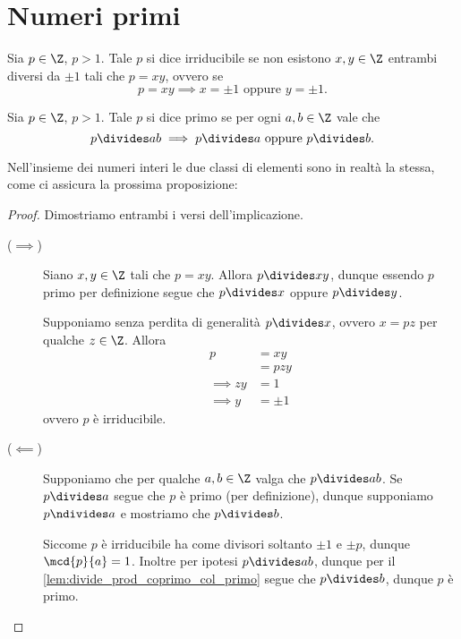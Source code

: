 \section{Numeri primi}

\begin{definition}
    [Irreducibile]
    Sia $p \in \Z$, $p > 1$. Tale $p$ si dice irriducibile se non esistono $x, y \in \Z$ entrambi diversi da $\pm 1$ tali che $p = xy$, ovvero se \begin{equation}
        p = xy \implies x = \pm 1 \text{ oppure } y = \pm 1.
    \end{equation}
\end{definition}

\begin{definition}
    [Primo]
    Sia $p \in \Z$, $p > 1$. Tale $p$ si dice primo se per ogni $a, b \in \Z$ vale che \begin{equation}
        p \divides ab \implies p \divides a \text{ oppure } p \divides b.
    \end{equation}
\end{definition}

Nell'insieme dei numeri interi le due classi di elementi sono in realtà la stessa, come ci assicura la prossima proposizione:
\begin{proof}
    Dimostriamo entrambi i versi dell'implicazione.
    \begin{description}
        \item[($\implies$)] Siano $x, y \in \Z$ tali che $p = xy$. Allora $p \divides xy$, dunque essendo $p$ primo per definizione segue che $p \divides x$ oppure $p \divides y$.
        
        Supponiamo senza perdita di generalità $p \divides x$, ovvero $x = pz$ per qualche $z \in \Z$. Allora \begin{align*}
            p &= xy \\
            &= pzy \\
            \implies zy &= 1 \\
            \implies y &= \pm 1
        \end{align*} ovvero $p$ è irriducibile.
        \item[($\impliedby$)] Supponiamo che per qualche $a, b \in \Z$ valga che $p \divides ab$. Se $p \divides a$ segue che $p$ è primo (per definizione), dunque supponiamo $p \ndivides a$ e mostriamo che $p \divides b$.
        
        Siccome $p$ è irriducibile ha come divisori soltanto $\pm 1$ e $\pm p$, dunque $\mcd{p}{a} = 1$. Inoltre per ipotesi $p \divides ab$, dunque per il \autoref{lem:divide_prod_coprimo_col_primo} segue che $p \divides b$, dunque $p$ è primo.
    \end{description}
\end{proof}

